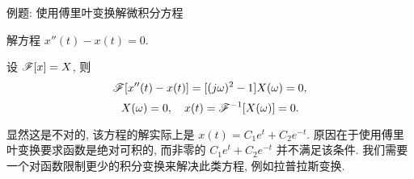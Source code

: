 \begin{frame}{例题: 使用傅里叶变换解微积分方程}
\beqskip{8pt}
\begin{example}
解方程 $x''(t)-x(t)=0$.
\end{example}
\begin{solution}
设 $\mathscr{F}[x]=X$,
\onslide<+->
则
\[\mathscr{F}[x''(t)-x(t)]=[(j\omega)^2-1]X(\omega)=0,\]%
\onslide<+->
\vspace{-\baselineskip}
\[X(\omega)=0,\quad x(t)=\mathscr{F}^{-1}[X(\omega)]=0.\]
\end{solution}
\onslide<+->
显然这是不对的, 该方程的解实际上是 $x(t)=C_1e^t+C_2e^{-t}$.
\onslide<+->
原因在于使用傅里叶变换要求函数是绝对可积的, 而非零的 $C_1e^t+C_2e^{-t}$ 并不满足该条件.
\onslide<+->
我们需要一个对函数限制更少的积分变换来解决此类方程, 例如拉普拉斯变换.
\endgroup
\end{frame}


